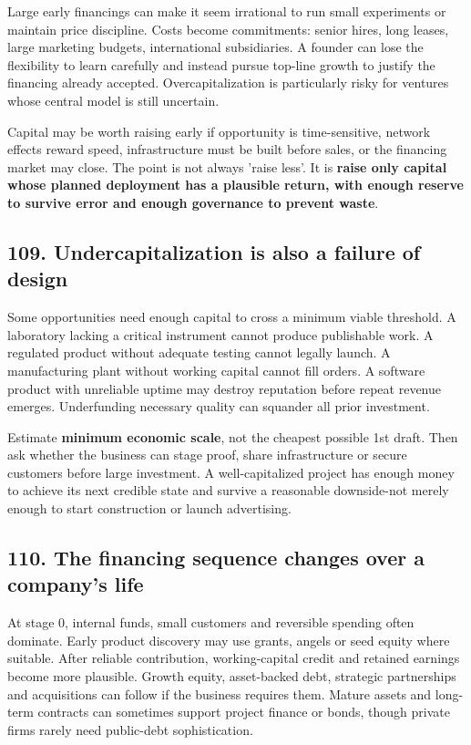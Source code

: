 Large early financings can make it seem irrational to run small experiments or maintain price discipline. Costs become commitments: senior hires, long leases, large marketing budgets, international subsidiaries. A founder can lose the flexibility to learn carefully and instead pursue top-line growth to justify the financing already accepted. Overcapitalization is particularly risky for ventures whose central model is still uncertain.

Capital may be worth raising early if opportunity is time-sensitive, network effects reward speed, infrastructure must be built before sales, or the financing market may close. The point is not always 'raise less'. It is \textbf{raise only capital whose planned deployment has a plausible return, with enough reserve to survive error and enough governance to prevent waste}.

\subsection{109. Undercapitalization is also a failure of design}


Some opportunities need enough capital to cross a minimum viable threshold. A laboratory lacking a critical instrument cannot produce publishable work. A regulated product without adequate testing cannot legally launch. A manufacturing plant without working capital cannot fill orders. A software product with unreliable uptime may destroy reputation before repeat revenue emerges. Underfunding necessary quality can squander all prior investment.

Estimate \textbf{minimum economic scale}, not the cheapest possible 1st draft. Then ask whether the business can stage proof, share infrastructure or secure customers before large investment. A well-capitalized project has enough money to achieve its next credible state and survive a reasonable downside-not merely enough to start construction or launch advertising.

\subsection{110. The financing sequence changes over a company's life}


At stage 0, internal funds, small customers and reversible spending often dominate. Early product discovery may use grants, angels or seed equity where suitable. After reliable contribution, working-capital credit and retained earnings become more plausible. Growth equity, asset-backed debt, strategic partnerships and acquisitions can follow if the business requires them. Mature assets and long-term contracts can sometimes support project finance or bonds, though private firms rarely need public-debt sophistication.

